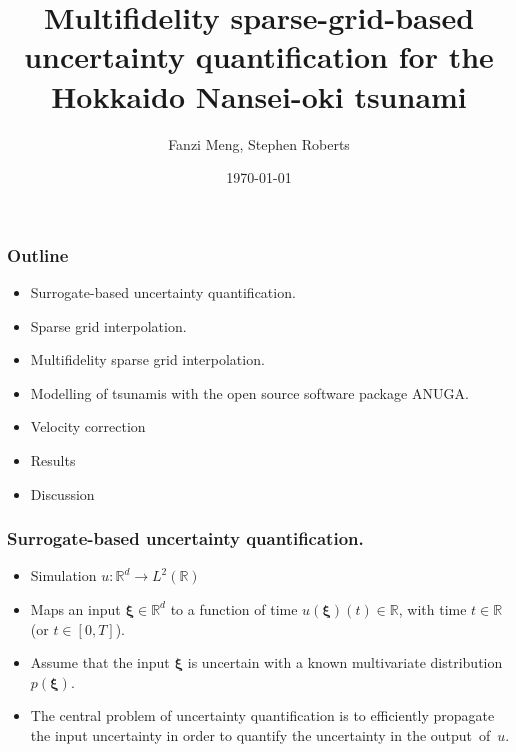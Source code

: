 \documentclass[11pt,ucs]{beamer}
\title[Multifidelity]{Multifidelity sparse-grid-based uncertainty quantification for the Hokkaido Nansei-oki tsunami}
\author[Roberts, Stephen] %
{Fanzi Meng, Stephen Roberts%
}
\institute[ANU] %
{
  Mathematical Sciences Institute\\
  College of Physical and Mathematical Sciences\\
  Australian National University
}
\date{\today}
\begin{document}
\begin{frame}
  \titlepage
\end{frame}


\begin{frame}\frametitle{Outline}

\begin{itemize}



\item Surrogate-based uncertainty quantification. 

\item Sparse grid interpolation.

\item Multifidelity sparse grid interpolation.

\item Modelling of tsunamis with the open source software package ANUGA. 

\item Velocity correction

\item Results 

\item Discussion


\end{itemize}

\end{frame}






\begin{frame}\frametitle{Surrogate-based uncertainty quantification. }

\begin{itemize}
\item Simulation $u : \mathbb{R}^{d} \rightarrow L^2(\mathbb{R})$ 

\item Maps an input $\boldsymbol{\xi} \in \mathbb{R}^d$ to a function of time $u(\boldsymbol{\xi})(t) \in \mathbb{R}$, with time $t\in\mathbb{R}$ (or $t \in [0,T]$). 

\item Assume that the input $\boldsymbol{\xi}$ is uncertain with a known multivariate distribution $p(\boldsymbol{\xi})$. 

\item The central problem of uncertainty quantification is to efficiently propagate the input uncertainty in order to quantify the uncertainty in the \mbox{output of $u$.}

\end{itemize}

\end{frame}
\end{document}
